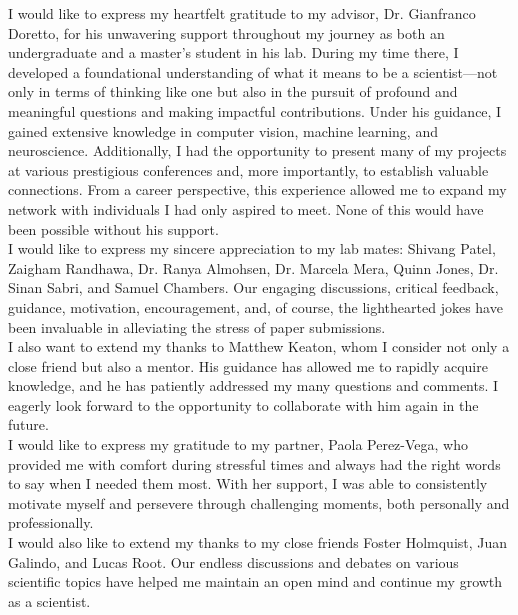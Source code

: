 \documentclass[
12pt, %
oneside, %
english, %
singlespacing, %
liststotoc, %
headsepline, %
chapterinoneline, %
]{MastersDoctoralThesis} %
\begin{document}
\begin{acknowledgements}
\addchaptertocentry{\acknowledgementname}  %

I would like to express my heartfelt gratitude to my advisor, Dr. Gianfranco Doretto, for his unwavering support throughout my journey as both an undergraduate and a master's student in his lab. During my time there, I developed a foundational understanding of what it means to be a scientist—not only in terms of thinking like one but also in the pursuit of profound and meaningful questions and making impactful contributions. Under his guidance, I gained extensive knowledge in computer vision, machine learning, and neuroscience. Additionally, I had the opportunity to present many of my projects at various prestigious conferences and, more importantly, to establish valuable connections. From a career perspective, this experience allowed me to expand my network with individuals I had only aspired to meet. None of this would have been possible without his support. \\

I would like to express my sincere appreciation to my lab mates: Shivang Patel, Zaigham Randhawa, Dr. Ranya Almohsen, Dr. Marcela Mera, Quinn Jones, Dr. Sinan Sabri, and Samuel Chambers. Our engaging discussions, critical feedback, guidance, motivation, encouragement, and, of course, the lighthearted jokes have been invaluable in alleviating the stress of paper submissions. \\

I also want to extend my thanks to Matthew Keaton, whom I consider not only a close friend but also a mentor. His guidance has allowed me to rapidly acquire knowledge, and he has patiently addressed my many questions and comments. I eagerly look forward to the opportunity to collaborate with him again in the future.\\

I would like to express my gratitude to my partner, Paola Perez-Vega, who provided me with comfort during stressful times and always had the right words to say when I needed them most. With her support, I was able to consistently motivate myself and persevere through challenging moments, both personally and professionally. \\

I would also like to extend my thanks to my close friends Foster Holmquist, Juan Galindo, and Lucas Root. Our endless discussions and debates on various scientific topics have helped me maintain an open mind and continue my growth as a scientist. \\


\end{acknowledgements}
\end{document}
